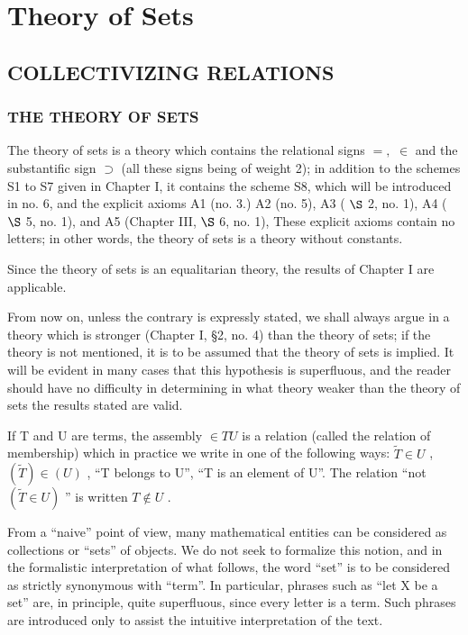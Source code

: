 \chapter{Theory of Sets}

\section{COLLECTIVIZING RELATIONS}

\subsection{THE THEORY OF SETS}

The theory of sets is a theory which contains the relational signs \(=,\) \(\in\) and the substantific sign \(\supset\) (all these signs being of weight 2); in addition to the schemes S1 to S7 given in Chapter I, it contains the scheme S8, which will be introduced in no. 6, and the explicit axioms A1 (no. 3.) A2 (no. 5), A3 ( \(\S\) 2, no. 1), A4 ( \(\S\) 5, no. 1), and A5 (Chapter III, \(\S\) 6, no. 1), These explicit axioms contain no letters; in other words, the theory of sets is a theory without constants.

Since the theory of sets is an equalitarian theory, the results of Chapter I are applicable.

From now on, unless the contrary is expressly stated, we shall always argue in a theory which is stronger (Chapter I, §2, no. 4) than the theory of sets; if the theory is not mentioned, it is to be assumed that the theory of sets is implied. It will be evident in many cases that this hypothesis is superfluous, and the reader should have no difficulty in determining in what theory weaker than the theory of sets the results stated are valid.

If T and U are terms, the assembly \(\in TU\) is a relation (called the relation of membership) which in practice we write in one of the following ways: \(\widetilde{T} \in U\) , \((\widetilde{T}) \in (U)\) , ``T belongs to U'', ``T is an element of U''. The relation ``not \((\widetilde{T} \in U)\) '' is written \(T \notin U\) .

From a ``naive'' point of view, many mathematical entities can be considered as collections or ``sets'' of objects. We do not seek to formalize this notion, and in the formalistic interpretation of what follows, the word ``set'' is to be considered as strictly synonymous with ``term''. In particular, phrases such as ``let X be a set'' are, in principle, quite superfluous, since every letter is a term. Such phrases are introduced only to assist the intuitive interpretation of the text.

